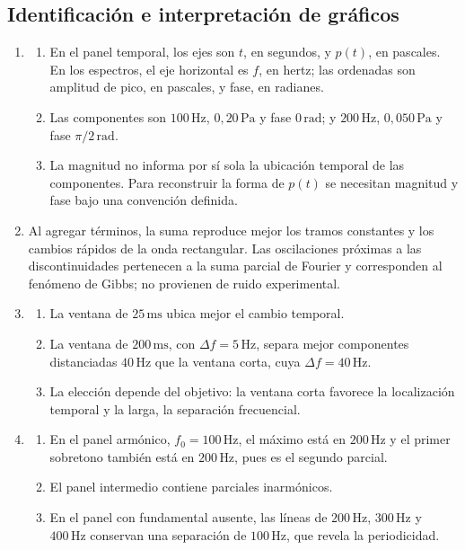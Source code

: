 \subsection*{Identificación e interpretación de gráficos}

\begin{enumerate}[label=\textbf{L\arabic*.},leftmargin=*]
    \item
    \begin{enumerate}[label=\alph*)]
        \item En el panel temporal, los ejes son \(t\), en segundos, y
        \(p(t)\), en pascales. En los espectros, el eje horizontal es
        \(f\), en hertz; las ordenadas son amplitud de pico, en pascales, y
        fase, en radianes.
        \item Las componentes son
        \(100\,\text{Hz}\), \(0{,}20\,\text{Pa}\) y fase \(0\,\text{rad}\);
        y \(200\,\text{Hz}\), \(0{,}050\,\text{Pa}\) y fase
        \(\pi/2\,\text{rad}\).
        \item La magnitud no informa por sí sola la ubicación temporal de las
        componentes. Para reconstruir la forma de \(p(t)\) se necesitan
        magnitud y fase bajo una convención definida.
    \end{enumerate}

    \item Al agregar términos, la suma reproduce mejor los tramos constantes
    y los cambios rápidos de la onda rectangular. Las oscilaciones próximas a
    las discontinuidades pertenecen a la suma parcial de Fourier y
    corresponden al fenómeno de Gibbs; no provienen de ruido experimental.

    \item
    \begin{enumerate}[label=\alph*)]
        \item La ventana de \(25\,\text{ms}\) ubica mejor el cambio temporal.
        \item La ventana de \(200\,\text{ms}\), con
        \(\Delta f=5\,\text{Hz}\), separa mejor componentes distanciadas
        \(40\,\text{Hz}\) que la ventana corta, cuya
        \(\Delta f=40\,\text{Hz}\).
        \item La elección depende del objetivo: la ventana corta favorece la
        localización temporal y la larga, la separación frecuencial.
    \end{enumerate}

    \item
    \begin{enumerate}[label=\alph*)]
        \item En el panel armónico, \(f_0=100\,\text{Hz}\), el máximo está en
        \(200\,\text{Hz}\) y el primer sobretono también está en
        \(200\,\text{Hz}\), pues es el segundo parcial.
        \item El panel intermedio contiene parciales inarmónicos.
        \item En el panel con fundamental ausente, las líneas de
        \(200\,\text{Hz}\), \(300\,\text{Hz}\) y \(400\,\text{Hz}\) conservan
        una separación de \(100\,\text{Hz}\), que revela la periodicidad.
    \end{enumerate}


\end{enumerate}
